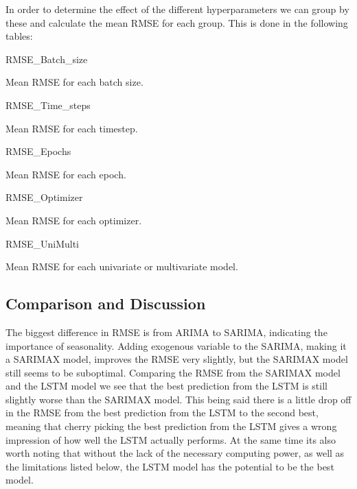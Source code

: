 In order to determine the effect of the different hyperparameters we can group by these and calculate the mean RMSE for each group. This is done in the following tables:
\begin{table}[H]
    \centering
    {RMSE_Batch_size}
    \caption{Mean RMSE for each batch size.}\label{tab:RMSE_batch_size}
\end{table}

\begin{minipage}{.5\textwidth\relax}
    \begin{table}[H]
        \centering
        {RMSE_Time_steps}
        \caption{Mean RMSE for each timestep.}\label{tab:RMSE_Tensorflow_groupby_timesteps}
    \end{table}
    \end{minipage}%
\begin{minipage}{.5\textwidth\relax}
\begin{table}[H]
    \centering
    {RMSE_Epochs}
    \caption{Mean RMSE for each epoch.}\label{tab:RMSE_epochs}
\end{table}
\end{minipage}%

\begin{minipage}{.5\textwidth\relax}
\begin{table}[H]
    \centering
    {RMSE_Optimizer}
    \caption{Mean RMSE for each optimizer.}\label{tab:RMSE_optimizer}
\end{table}
\end{minipage}%
\begin{minipage}{.5\textwidth\relax}
\begin{table}[H]
    \centering
    {RMSE_UniMulti}
    \caption{Mean RMSE for each univariate or multivariate model.}\label{tab:RMSE_uni_multi}
\end{table}
\end{minipage}%


\subsection{Comparison and Discussion}\label{sec:comparison}

The biggest difference in RMSE is from ARIMA to SARIMA, indicating the importance of seasonality. Adding exogenous variable to the SARIMA, making it a SARIMAX model, improves the RMSE very slightly, but the SARIMAX model still seems to be suboptimal. Comparing the RMSE from the SARIMAX model and the LSTM model we see that the best prediction from the LSTM is still slightly worse than the SARIMAX model. This being said there is a little drop off in the RMSE from the best prediction from the LSTM to the second best, meaning that cherry picking the best prediction from the LSTM gives a wrong impression of how well the LSTM actually performs. At the same time its also worth noting that without the lack of the necessary computing power, as well as the limitations listed below, the LSTM model has the potential to be the best model.

